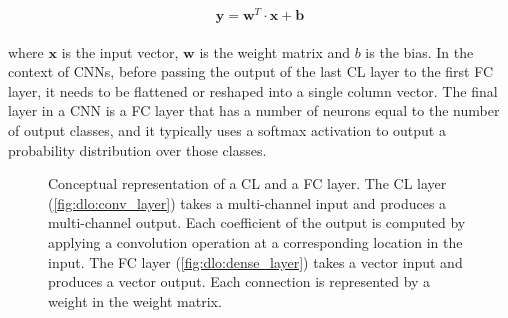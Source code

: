 \begin{equation}
  \label{eqn:dlo:fc_layer}
  \mathbf{y} = \mathbf{w}^T \cdot \mathbf{x} + \mathbf{b}
\end{equation}\\

\noindent where $\mathbf{x}$ is the input vector, $\mathbf{w}$ is the weight
matrix and $b$ is the bias. In the context of \acp{CNN}, before passing the
output of the last \ac{CL} layer to the first \ac{FC} layer, it needs to be
flattened or reshaped into a single column vector. The final layer in a \ac{CNN}
is a \ac{FC} layer that has a number of neurons equal to the number of output
classes, and it typically uses a softmax activation to output a probability
distribution over those classes.\\



\begin{figure}[htbp]
  \centering
    \caption{Conceptual representation of a \acl{CL} and a \acl{FC} layer. The
    \acl{CL} layer (\cref{fig:dlo:conv_layer}) takes a multi-channel input and
    produces a multi-channel output. Each coefficient of the output is computed
    by applying a convolution operation at a corresponding location in the
    input. The \acl{FC} layer (\cref{fig:dlo:dense_layer}) takes a vector input
    and produces a vector output. Each connection is represented by a weight in
    the weight matrix.}
  \label{fig:sota:layers}
\end{figure}

